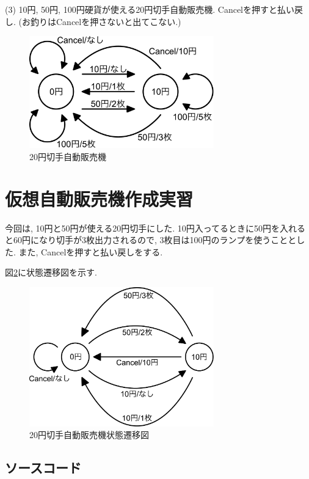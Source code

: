 \documentclass[titlepage]{jsarticle}
\begin{document}
    (3) 10円, 50円, 100円硬貨が使える20円切手自動販売機. Cancelを押すと払い戻し.
    (お釣りはCancelを押さないと出てこない.)

    \begin{figure}[ht]
        \centering
        \includegraphics[width=8cm]{images/20.pdf}
        \caption{20円切手自動販売機}
        \label{fig:20状態遷移図}
    \end{figure}

\section{仮想自動販売機作成実習}
    今回は, 10円と50円が使える20円切手にした.
    10円入ってるときに50円を入れると60円になり切手が3枚出力されるので,
    3枚目は100円のランプを使うこととした.
    また, Cancelを押すと払い戻しをする.

    図\ref{fig:本番状態遷移図}に状態遷移図を示す.

    \begin{figure}[ht]
        \centering
        \includegraphics[width=8cm]{images/honban.pdf}
        \caption{20円切手自動販売機状態遷移図}
        \label{fig:本番状態遷移図}
    \end{figure}

    \subsection{ソースコード}
    
\end{document}
